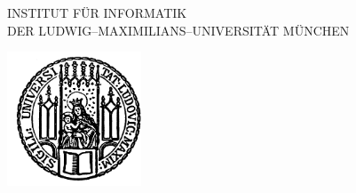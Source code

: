 %
%
%
%


\ifpdf
\fi


\thispagestyle{empty}

\begin{center}

\vspace*{-2cm}

{\Huge INSTITUT FÜR INFORMATIK\\[1mm]}
DER LUDWIG--MAXIMILIANS--UNIVERSITÄT MÜNCHEN\\

\vspace*{1cm}

\includegraphics[width=0.3\textwidth]{lmu_siegel}

\vspace*{2cm}

{\Large \textbf{\typeOfThesis}}\\

\vspace{2.0cm}
{\Huge \textbf{\titleOfThesisOne}}\\
\vspace*{3mm}
{\Huge \textbf{\titleOfThesisTwo}}\\
\vspace*{3mm}
{\Huge \textbf{\titleOfThesisThree}}\\

\vspace{1.5cm}

{\LARGE \authorOfThesis}\\[2mm]
{\LARGE \authorOfThesisOne}\\[2mm]
{\LARGE \authorOfThesisTwo}\\[2mm]




\end{center}
